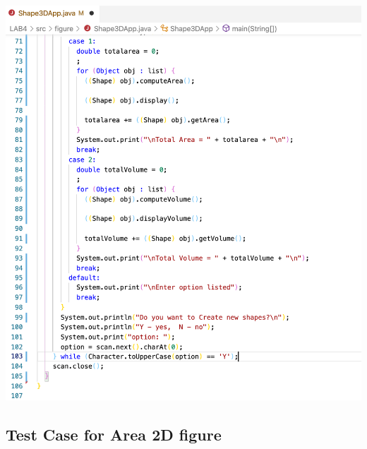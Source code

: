\documentclass[hidelinks,12pt]{article}
\begin{document}
    \includegraphics[scale=0.3]{z_shape3dapp3.png}
  
\subsection{Test Case for Area 2D figure}
\end{document}

